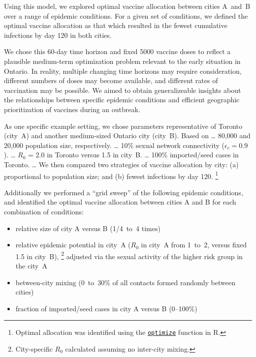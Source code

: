 Using this model, we explored optimal vaccine allocation between cities A~and~B
over a range of epidemic conditions.
For a given set of conditions, we defined the optimal vaccine allocation as that which
resulted in the fewest cumulative infections by day 120 in both cities.
\par
We chose this 60-day time horizon and fixed 5000 vaccine doses to reflect
a plausible medium-term optimization problem relevant to the early \MPXV situation in Ontario.
In reality, multiple changing time horizons may require consideration,
different numbers of doses may become available, and
different rates of vaccination may be possible.
We aimed to obtain generalizeable insights about the relationships between
specific epidemic conditions and efficient geographic prioritization of vaccines during an outbreak.
\par
As one specific example setting, we chose parameters representative of
Toronto (city~A) and another medium-sized Ontario city (city~B).
Based on 
\dots
80,000 and 20,000 \GBMSM population size, respectively.
\dots
10\% sexual network connectivity ($\epsilon_c = 0.9$).
\dots
$R_0$ = 2.0 in Toronto versus 1.5 in city~B.
\dots
100\% imported/seed cases in Toronto.
\dots
We then compared two strategies of vaccine allocation by city:
(a) proportional to population size; and
(b) fewest infections by day 120.%
\footnote{Optimal allocation was identified using the
  \href{https://www.rdocumentation.org/link/optimize?package=stats}{\texttt{optimize}} function in R.}
\par
Additionally we performed a ``grid sweep'' of the following epidemic conditions,
and identified the optimal vaccine allocation between cities A and B for each combination of conditions:
\begin{itemize}
  \item relative size of city A versus B (1/4~to~4 times)
  \item relative epidemic potential in city~A ($R_0$ in city~A from 1~to~2, versus fixed 1.5 in city~B),%
  \footnote{City-specific $R_0$ calculated assuming no inter-city mixing.}
        adjusted via the sexual activity of the higher risk group in the city~A
  \item between-city mixing (0~to~30\% of all contacts formed randomly between cities)
  \item fraction of imported/seed cases in city A versus B (0--100\%)
\end{itemize}


